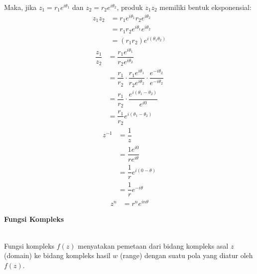 \documentclass{article}
\begin{document}
Maka, jika $z_1 = r_1e^{i\theta_1}$ dan $z_2 = r_2e^{i\theta_2}$, produk $z_1z_2$ memiliki bentuk eksponensial:
\begin{align}
    z_1z_2 & = r_1e^{i\theta_1} r_2e^{i\theta_2}
    \nonumber                                    \\
           & = r_1r_2e^{i\theta_1}e^{i\theta_2}
    \nonumber                                    \\
           & = (r_1r_2)e^{i(\theta_1\theta_2)}
    \nonumber
\end{align}
\begin{align}
    \dfrac{z_1}{z_2} & = \dfrac{r_1e^{i\theta_1}}{r_2e^{i\theta_2}}
    \nonumber                                                                                                                           \\
                     & = \dfrac{r_1}{r_2} \cdot \dfrac{r_1e^{i\theta_1}}{r_2e^{i\theta_2}} \cdot \dfrac{e^{-i\theta_2}}{e^{-i\theta_2}}
    \nonumber                                                                                                                           \\
                     & = \dfrac{r_1}{r_2} \cdot \dfrac{e^{i(\theta_1-\theta_2)}}{e^{i0}}
    \nonumber                                                                                                                           \\
                     & = \dfrac{r_1}{r_2} e^{i(\theta_1-\theta_2)}
    \nonumber
\end{align}
\begin{align}
    z^{-1} & = \dfrac{1}{z}
    \nonumber                                \\
           & = \dfrac{1e^{i0}}{re^{i\theta}}
    \nonumber                                \\
           & = \dfrac{1}{r} e^{i(0-\theta)}
    \nonumber                                \\
           & = \dfrac{1}{r} e^{-i\theta}
    \nonumber
\end{align}
\begin{align}
    z^n & = r^n e^{in\theta}
    \nonumber
\end{align}



\newpage
\begin{center}
    \textbf{Fungsi Kompleks}
\end{center}
\leavevmode\\

Fungsi kompleks $f(z)$ menyatakan pemetaan dari bidang kompleks asal $z$ (domain) ke bidang kompleks hasil $w$ (range) dengan suatu pola yang diatur oleh $f(z)$.
\\
\end{document}
